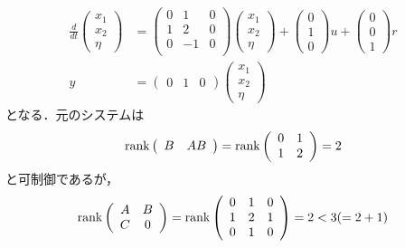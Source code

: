 \begin{align}
 \frac{d}{dt}
 \left(
 \begin{array}{c}
  x_1 \\
  x_2 \\
  \eta
 \end{array}
 \right) &=
 \left(
 \begin{array}{ccc}
  0 & 1 & 0 \\
  1 & 2 & 0 \\
  0 & -1 & 0 \\
 \end{array}
 \right)
 \left(
 \begin{array}{c}
  x_1 \\
  x_2 \\
  \eta
 \end{array}
 \right) +
 \left(
 \begin{array}{c}
  0 \\
  1 \\
  0
 \end{array}
 \right) u +
 \left(
 \begin{array}{c}
  0 \\
  0 \\
  1
 \end{array}
 \right) r \\
 y &= 
 \left(
 \begin{array}{ccc}
  0 & 1 & 0
 \end{array}
 \right)
 \left(
 \begin{array}{c}
  x_1 \\
  x_2 \\
  \eta
 \end{array}
 \right)
\end{align}
となる．元のシステムは
\begin{gather}
 \mathop{\rm rank}\nolimits
 \left(
 \begin{array}{cc}
  B & AB
 \end{array}
 \right) =
 \mathop{\rm rank}\nolimits
 \left(
 \begin{array}{cc}
  0 & 1 \\
  1 & 2
 \end{array}
 \right) = 2 \\
\end{gather}
と可制御であるが，
\begin{gather}
 \mathop{\rm rank}\nolimits
 \left(
 \begin{array}{cc}
  A & B \\
  C & 0
 \end{array}
 \right) = 
 \mathop{\rm rank}\nolimits
 \left(
 \begin{array}{ccc}
  0 & 1 & 0 \\
  1 & 2 & 1 \\
  0 & 1 & 0
 \end{array}
 \right) = 
 2 < 3(= 2 + 1)
\end{gather}
